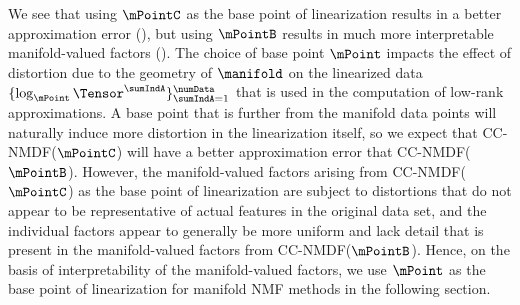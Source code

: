 We see that using $\mPointC$ as the base point of linearization results in a better approximation error (), but using $\mPointB$ results in much more interpretable manifold-valued factors (). The choice of base point $\mPoint$ impacts the effect of distortion due to the geometry of $\manifold$ on the linearized data $\{\log_\mPoint \Tensor^\sumIndA\}_{\sumIndA=1}^\numData$ that is used in the computation of low-rank approximations. A base point that is further from the manifold data points will naturally induce more distortion in the linearization itself, so we expect that CC-NMDF($\mPointC$) will have a better approximation error that CC-NMDF($\mPointB$). However, the manifold-valued factors arising from CC-NMDF($\mPointC$) as the base point of linearization are subject to distortions that do not appear to be representative of actual features in the original data set, and the individual factors appear to generally be more uniform and lack detail that is present in the manifold-valued factors from CC-NMDF($\mPointB$). Hence, on the basis of interpretability of the manifold-valued factors, we use $\mPoint$ as the base point of linearization for manifold NMF methods in the following section.

